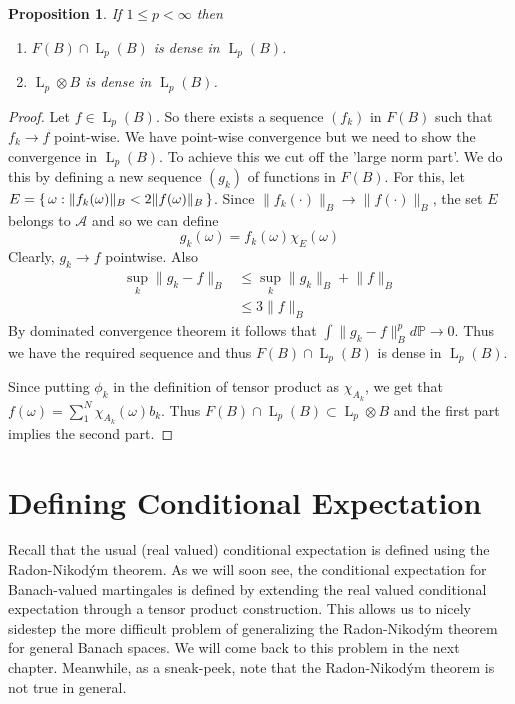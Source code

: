 \documentclass[]{report}
\newcommand{\lp}[2]{\operatorname{L}_{#1}({#2})}
\newcommand*{\Normb}[2]{\lVert {#1} \rVert_{#2}}
\newtheorem{prop}[theorem]{Proposition}
\begin{document}
\begin{prop} \label{density}
	If $1\leq p < \infty$ then
	\begin{enumerate}
		\item $F(B) \cap \lp{p}{B}$ is dense in $\lp{p}{B}$.
		\item $\operatorname{L}_p\otimes B$ is dense in $\lp{p}{B}$.
	\end{enumerate}
\end{prop}
\begin{proof}
	Let $f \in \lp{p}{B}$. So there exists a sequence $(f_k)$ in $F(B)$ such that $f_k \rightarrow f$ point-wise. We have point-wise convergence but we need to show the convergence in $\lp{p}{B}$. To achieve this we cut off the 'large norm part'. We do this by defining a new sequence $(g_k)$ of functions in $F(B)$. For this, let $E=\set{\omega:\Normb{f_k(\omega)}{B}< 2\Normb{f(\omega)}{B}}$. Since $\Normb{f_k(\cdot)}{B} \rightarrow \Normb{f(\cdot)}{B}$, the set $E$ belongs to $\mathcal{A}$ and so we can define \[g_k(\omega)= f_k(\omega) \chi_E(\omega)\]
	Clearly, $g_k \rightarrow f$ pointwise. Also 
	\begin{equation*}
	\begin{aligned}
	\sup_{k}\Normb{g_k-f}{B}&\leq \sup_{k}\Normb{g_k}{B}+\Normb{f}{B} \\
	&\leq 3\Normb{f}{B}
	\end{aligned}
	\end{equation*}
	By dominated convergence theorem it follows that $\int\Normb{g_k-f}{B}^pd\mathbb{P}\rightarrow 0$. Thus we have the required sequence and thus $F(B) \cap \lp{p}{B}$ is dense in $\lp{p}{B}$.
	
	Since putting $\phi_k$ in the definition of tensor product as $\chi_{A_k}$, we get that $f(\omega)= \sum_{1}^{N} \chi_{A_k}(\omega)b_k $. Thus $F(B) \cap \lp{p}{B}\subset \operatorname{L}_p\otimes B$ and the first part implies the second part.
\end{proof}

\section{Defining Conditional Expectation}
Recall that the usual (real valued) conditional expectation is defined using the Radon-Nikod\'{y}m theorem. As we will soon see, the conditional expectation for Banach-valued martingales is defined by extending the real valued conditional expectation through a tensor product construction. This allows us to nicely sidestep the more difficult problem of generalizing the Radon-Nikod\'{y}m theorem for general Banach spaces. We will come back to this problem in the next chapter. Meanwhile, as a sneak-peek, note that the Radon-Nikod\'ym theorem is not true in general. 
\end{document}

